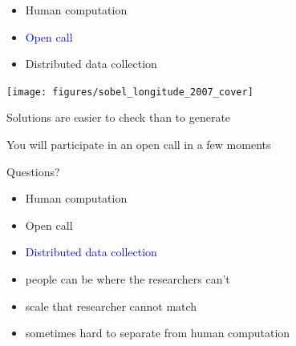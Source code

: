 \documentclass[aspectratio=169]{beamer}
\begin{document}
\begin{frame}

\begin{itemize}
\item Human computation
\item \textcolor{blue}{Open call}
\item Distributed data collection
\end{itemize}

\end{frame}
\begin{frame}

\begin{center}
\texttt{[image: figures/sobel\_longitude\_2007\_cover]}
\end{center}

\end{frame}
\begin{frame}

{\Large
\begin{center}
Solutions are easier to check than to generate
\end{center}
}

\end{frame}
\begin{frame}

{\Large
\begin{center}
You will participate in an open call in a few moments
\end{center}
}

\end{frame}
\begin{frame}

{\Large
\begin{center}
Questions? 
\end{center}
}

\end{frame}
\begin{frame}

\begin{itemize}
\item Human computation
\item Open call
\item \textcolor{blue}{Distributed data collection}
\end{itemize}

\end{frame}
\begin{frame}

\begin{itemize}
\item people can be where the researchers can't
\pause
\item scale that researcher cannot match
\pause
\item sometimes hard to separate from human computation
\end{itemize}

\end{frame}
\end{document}
